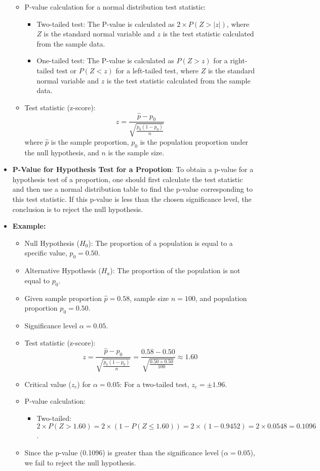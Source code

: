 \documentclass{article}
\begin{document}
\begin{itemize}
\begin{itemize}
    \item P-value calculation for a normal distribution test statistic:
    \begin{itemize}
        \item Two-tailed test: The P-value is calculated as $2 \times P(Z > |z|)$, where $Z$ is the standard normal variable and $z$ is the test statistic calculated from the sample data.
        \item One-tailed test: The P-value is calculated as $P(Z > z)$ for a right-tailed test or $P(Z < z)$ for a left-tailed test, where $Z$ is the standard normal variable and $z$ is the test statistic calculated from the sample data.
    \end{itemize}
    \item Test statistic (z-score):
    \[
    z = \frac{\hat{p} - p_0}{\sqrt{\frac{p_0 (1 - p_0)}{n}}}
    \]
    where $\hat{p}$ is the sample proportion, $p_0$ is the population proportion under the null hypothesis, and $n$ is the sample size.
\end{itemize}


\item \textbf{P-Value for Hypothesis Test for a Propotion}: To obtain a p-value for a hypothesis test of a proportion, one should first calculate the test statistic and then use a normal distribution table to find the p-value corresponding to this test statistic. If this p-value is less than the chosen significance level, the conclusion is to reject the null hypothesis.

\item \textbf{Example:}
\begin{itemize}
    \item Null Hypothesis ($H_0$): The proportion of a population is equal to a specific value, $p_0 = 0.50$.
    \item Alternative Hypothesis ($H_a$): The proportion of the population is not equal to $p_0$.
    \item Given sample proportion $\hat{p} = 0.58$, sample size $n = 100$, and population proportion $p_0 = 0.50$.
    \item Significance level $\alpha = 0.05$.
    \item Test statistic (z-score):
    \[
    z = \frac{\hat{p} - p_0}{\sqrt{\frac{p_0 (1 - p_0)}{n}}} = \frac{0.58 - 0.50}{\sqrt{\frac{0.50 \times 0.50}{100}}} \approx 1.60
    \]
    \item Critical value ($z_c$) for $\alpha = 0.05$: For a two-tailed test, $z_c = \pm 1.96$.
    \item P-value calculation:
    \begin{itemize}
        \item Two-tailed: $2 \times P(Z > 1.60) = 2 \times (1 - P(Z \leq 1.60)) = 2 \times (1 - 0.9452) = 2 \times 0.0548 = 0.1096$.
    \end{itemize}
    \item Since the p-value (0.1096) is greater than the significance level ($\alpha = 0.05$), we fail to reject the null hypothesis.
\end{itemize}



\end{itemize}
\end{document}

